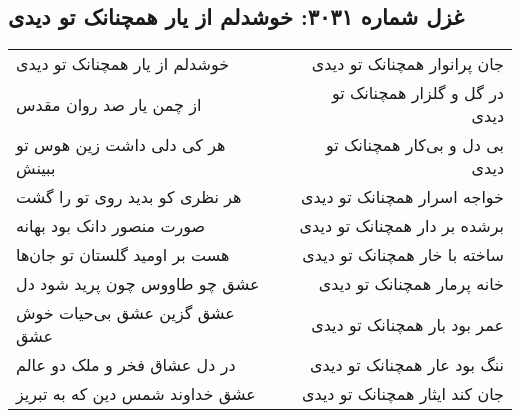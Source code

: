 \begin{center}
\section*{غزل شماره ۳۰۳۱: خوشدلم از یار همچنانک تو دیدی}
\label{sec:3031}
\begin{longtable}{l p{0.5cm} r}
خوشدلم از یار همچنانک تو دیدی
&&
جان پرانوار همچنانک تو دیدی
\\
از چمن یار صد روان مقدس
&&
در گل و گلزار همچنانک تو دیدی
\\
هر کی دلی داشت زین هوس تو ببینش
&&
بی دل و بی‌کار همچنانک تو دیدی
\\
هر نظری کو بدید روی تو را گشت
&&
خواجه اسرار همچنانک تو دیدی
\\
صورت منصور دانک بود بهانه
&&
برشده بر دار همچنانک تو دیدی
\\
هست بر اومید گلستان تو جان‌ها
&&
ساخته با خار همچنانک تو دیدی
\\
عشق چو طاووس چون پرید شود دل
&&
خانه پرمار همچنانک تو دیدی
\\
عشق گزین عشق بی‌حیات خوش عشق
&&
عمر بود بار همچنانک تو دیدی
\\
در دل عشاق فخر و ملک دو عالم
&&
ننگ بود عار همچنانک تو دیدی
\\
عشق خداوند شمس دین که به تبریز
&&
جان کند ایثار همچنانک تو دیدی
\\
\end{longtable}
\end{center}
